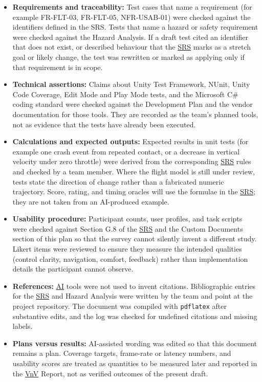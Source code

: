 \documentclass[12pt, titlepage]{article}
\begin{document}
\begin{enumerate}
    \begin{itemize}
        \item \textbf{Requirements and traceability:} Test cases that name
        a requirement (for example FR-FLT-03, FR-FLT-05, NFR-USAB-01) were
        checked against the identifiers defined in the SRS. Tests that name
        a hazard or safety requirement were checked against the Hazard
        Analysis. If a draft test cited an identifier that does not exist,
        or described behaviour that the \hyperlink{abbr:SRS}{SRS} marks as a stretch goal or
        likely change, the test was rewritten or marked as applying only if
        that requirement is in scope.
        \item \textbf{Technical assertions:} Claims about Unity Test
        Framework, NUnit, Unity Code Coverage, Edit Mode and Play Mode
        tests, and the Microsoft C\# coding standard were checked against
        the Development Plan and the vendor documentation for those tools.
        They are recorded as the team's planned tools, not as evidence that
        the tests have already been executed.
        \item \textbf{Calculations and expected outputs:} Expected results
        in unit tests (for example one crash event from repeated contact,
        or a decrease in vertical velocity under zero throttle) were
        derived from the corresponding \hyperlink{abbr:SRS}{SRS} rules and checked by a team
        member. Where the flight model is still under review, tests state
        the direction of change rather than a fabricated numeric
        trajectory. Score, rating, and timing oracles will use the formulae
        in the \hyperlink{abbr:SRS}{SRS}; they are not taken from an AI-produced example.
        \item \textbf{Usability procedure:} Participant counts, user
        profiles, and task scripts were checked against Section G.8 of the
        \hyperlink{abbr:SRS}{SRS} and the Custom Documents section of this plan so that the
        survey cannot silently invent a different study. Likert items were
        reviewed to ensure they measure the intended qualities (control
        clarity, navigation, comfort, feedback) rather than implementation
        details the participant cannot observe.
        \item \textbf{References:} \hyperlink{abbr:AI}{AI} tools were not used to invent
        citations. Bibliographic entries for the \hyperlink{abbr:SRS}{SRS} and Hazard Analysis
        were written by the team and point at the project repository. The
        document was compiled with \texttt{pdflatex} after substantive
        edits, and the log was checked for undefined citations and missing
        labels.
        \item \textbf{Plans versus results:} AI-assisted wording was edited
        so that this document remains a plan. Coverage targets, frame-rate
        or latency numbers, and usability scores are treated as quantities
        to be measured later and reported in the \hyperlink{abbr:VnV}{VnV} Report, not as
        verified outcomes of the present draft.
    \end{itemize}


\end{enumerate}
\end{document}

